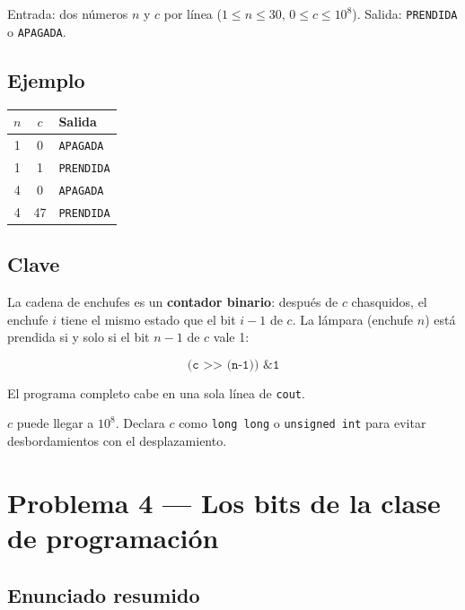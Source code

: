\documentclass[12pt, oneside]{article}
\begin{document}
Entrada: dos números $n$ y $c$ por línea ($1 \le n \le 30$, $0 \le c \le 10^8$).
Salida: \texttt{PRENDIDA} o \texttt{APAGADA}.

\subsection{Ejemplo}

\begin{center}
\begin{tabular}{ccl}
  \toprule
  $n$ & $c$ & Salida \\
  \midrule
  1 &  0 & \texttt{APAGADA} \\
  1 &  1 & \texttt{PRENDIDA} \\
  4 &  0 & \texttt{APAGADA} \\
  4 & 47 & \texttt{PRENDIDA} \\
  \bottomrule
\end{tabular}
\end{center}

\subsection{Clave}

La cadena de enchufes es un \textbf{contador binario}: después de $c$ chasquidos,
el enchufe $i$ tiene el mismo estado que el bit $i-1$ de $c$.  La lámpara
(enchufe $n$) está prendida si y solo si el bit $n-1$ de $c$ vale 1:

\[
  \texttt{(c >> (n-1)) \& 1}
\]

El programa completo cabe en una sola línea de \texttt{cout}.

\begin{advertencia}
  $c$ puede llegar a $10^8$.  Declara $c$ como \texttt{long long} o
  \texttt{unsigned int} para evitar desbordamientos con el desplazamiento.
\end{advertencia}

\newpage

\section{Problema 4 — Los bits de la clase de programación}

\subsection{Enunciado resumido}
\end{document}
